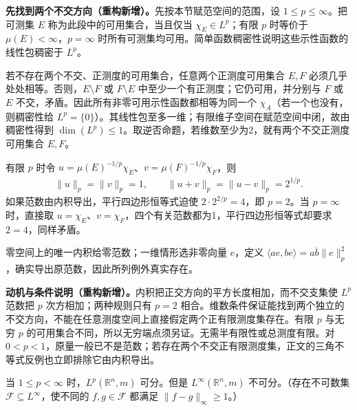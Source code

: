 \documentclass[../../main.tex]{subfiles}
\begin{document}
\begin{solution}
\textbf{先找到两个不交方向（重构新增）。}先按本节赋范空间的范围，设 $1\leqslant p\leqslant\infty$。把可测集 $E$ 称为此段中的可用集合，当且仅当 $\chi_E\in L^p$；有限 $p$ 时等价于 $\mu(E)<\infty$，$p=\infty$ 时所有可测集均可用。简单函数稠密性说明这些示性函数的线性包稠密于 $L^p$。

若不存在两个不交、正测度的可用集合，任意两个正测度可用集合 $E,F$ 必须几乎处处相等。否则，$E\setminus F$ 或 $F\setminus E$ 中至少一个有正测度；它仍可用，并分别与 $F$ 或 $E$ 不交，矛盾。因此所有非零可用示性函数都相等为同一个 $\chi_A$（若一个也没有，则稠密性给 $L^p=\{0\}$）。其线性包至多一维；有限维子空间在赋范空间中闭，故由稠密性得到 $\dim(L^p)\leqslant1$。取逆否命题，若维数至少为2，就有两个不交正测度可用集合 $E,F$。

有限 $p$ 时令 $u=\mu(E)^{-1/p}\chi_E$、$v=\mu(F)^{-1/p}\chi_F$，则
\begin{align*}
\|u\|_p=\|v\|_p=1,
\qquad \|u+v\|_p=\|u-v\|_p=2^{1/p}.
\end{align*}
如果范数由内积导出，平行四边形恒等式迫使 $2\cdot2^{2/p}=4$，即 $p=2$。当 $p=\infty$ 时，直接取 $u=\chi_E$、$v=\chi_F$，四个有关范数都为1，平行四边形恒等式却要求 $2=4$，同样矛盾。

零空间上的唯一内积给零范数；一维情形选非零向量 $e$，定义 $\langle ae,be\rangle=a\overline b\|e\|_p^2$，确实导出原范数，因此所列例外真实存在。
\end{solution}
\begin{remark}
\textbf{动机与条件说明（重构新增）。}内积把正交方向的平方长度相加，而不交支集使 $L^p$ 范数把 $p$ 次方相加；两种规则只有 $p=2$ 相合。维数条件保证能找到两个独立的不交方向，不能在任意测度空间上直接假定两个正有限测度集存在。有限 $p$ 与无穷 $p$ 的可用集合不同，所以无穷端点须另证。无需半有限性或总测度有限。对 $0<p<1$，原量一般已不是范数；若存在两个不交正有限测度集，正文的三角不等式反例也立即排除它由内积导出。
\end{remark}
\begin{exercise}\label{exercise:ch06-lebesgue-separability}
当 $1\leqslant p<\infty$ 时，$L^p(\mathbb R^n,m)$ 可分。但是 $L^\infty(\mathbb R^n,m)$ 不可分。（存在不可数集 $\mathscr F\subseteq L^\infty$，使不同的 $f,g\in\mathscr F$ 都满足 $\|f-g\|_\infty\geqslant1$。）
\end{exercise}
\end{document}

